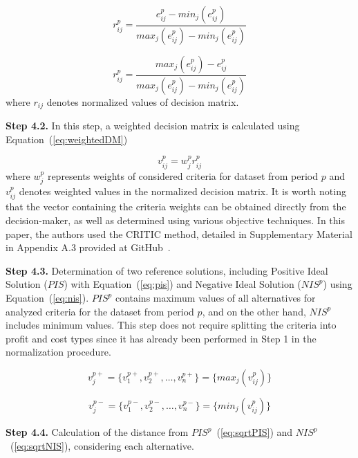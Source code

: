 \documentclass[5p,times]{elsarticle}
\begin{document}
\begin{equation}
    r_{ij}^{p} = \frac{e_{ij}^{p} - min_{j}(e_{ij}^{p})}{max_{j}(e_{ij}^{p})-min_{j}(e_{ij}^{p})} \label{eq:minmaxProfit}
\end{equation}

\begin{equation}
    r_{ij}^{p} = \frac{max_{j}(e_{ij}^{p}) - e_{ij}^{p}}{max_{j}(e_{ij}^{p})-min_{j}(e_{ij}^{p})} \label{eq:minmaxCost}
\end{equation}
%
where $r_{ij}$ denotes normalized values of decision matrix.

\textbf{Step 4.2.} In this step, a weighted decision matrix is calculated using Equation~(\ref{eq:weightedDM})

\begin{equation}
    v_{ij}^{p} = w_{j}^{p}r_{ij}^{p} \label{eq:weightedDM}
\end{equation}
%
where $w_{j}^{p}$ represents weights of considered criteria for dataset from period $p$ and $v_{ij}^{p}$ denotes weighted values in the normalized decision matrix. It is worth noting that the vector containing the criteria weights can be obtained directly from the decision-maker, as well as determined using various objective techniques. In this paper, the authors used the CRITIC method, detailed in Supplementary Material in Appendix A.3 provided at GitHub~\cite{dariagithub2022}.

\textbf{Step 4.3.} Determination of two reference solutions, including Positive Ideal Solution ($PIS$) with Equation~(\ref{eq:pis}) and Negative Ideal Solution ($NIS^{p}$) using Equation~(\ref{eq:nis}). $PIS^{p}$ contains maximum values of all alternatives for analyzed criteria for the dataset from period $p$, and on the other hand, $NIS^{p}$ includes minimum values. This step does not require splitting the criteria into profit and cost types since it has already been performed in Step 1 in the normalization procedure. 

\begin{equation}
v_{j}^{p+} = \{v_{1}^{p+}, v_{2}^{p+}, \ldots, v_{n}^{p+}\} = \{max_{j}(v_{ij}^{p})\} \label{eq:pis}
\end{equation}

\begin{equation}
v_{j}^{p-} = \{v_{1}^{p-}, v_{2}^{p-}, \ldots, v_{n}^{p-}\} = \{min_{j}(v_{ij}^{p})\} \label{eq:nis}
\end{equation}

\textbf{Step 4.4.} Calculation of the distance from $PIS^{p}$~(\ref{eq:sqrtPIS}) and $NIS^{p}$~(\ref{eq:sqrtNIS}), considering each alternative.
\end{document}
